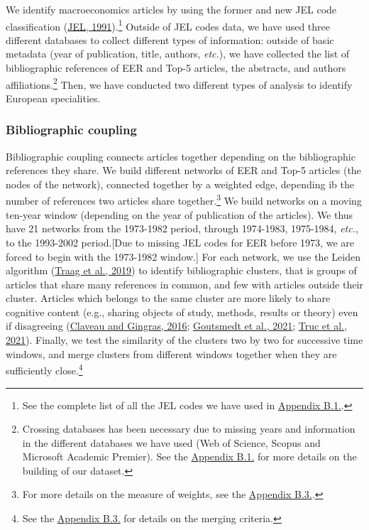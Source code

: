\documentclass[]{elsarticle} %
\begin{document}
We identify macroeconomics articles by using the former and new JEL code
classification (\protect\hyperlink{ref-jel1991}{JEL, 1991}).\footnote{See
  the complete list of all the JEL codes we have used in
  \protect\hyperlink{eer-top5-macro}{Appendix B.1.}.} Outside of JEL
codes data, we have used three different databases to collect different
types of information: outside of basic metadata (year of publication,
title, authors, \emph{etc.}), we have collected the list of
bibliographic references of EER and Top-5 articles, the abstracts, and
authors affiliations.\footnote{Crossing databases has been necessary due
  to missing years and information in the different databases we have
  used (Web of Science, Scopus and Microsoft Academic Premier). See the
  \protect\hyperlink{corpus}{Appendix B.1.} for more details on the
  building of our dataset.} Then, we have conducted two different types
of analysis to identify European specialities.

\hypertarget{bibliographic-coupling}{%
\subsubsection{Bibliographic coupling}\label{bibliographic-coupling}}

Bibliographic coupling connects articles together depending on the
bibliographic references they share. We build different networks of EER
and Top-5 articles (the nodes of the network), connected together by a
weighted edge, depending ib the number of references two articles share
together.\footnote{For more details on the measure of weights, see the
  \protect\hyperlink{network}{Appendix B.3.}.} We build networks on a
moving ten-year window (depending on the year of publication of the
articles). We thus have 21 networks from the 1973-1982 period, through
1974-1983, 1975-1984, \emph{etc.}, to the 1993-2002 period.{[}Due to
missing JEL codes for EER before 1973, we are forced to begin with the
1973-1982 window.{]} For each network, we use the Leiden algorithm
(\protect\hyperlink{ref-traag2019}{Traag et al., 2019}) to identify
bibliographic clusters, that is groups of articles that share many
references in common, and few with articles outside their cluster.
Articles which belongs to the same cluster are more likely to share
cognitive content (e.g., sharing objects of study, methods, results or
theory) even if disagreeing (\protect\hyperlink{ref-claveau2016}{Claveau
and Gingras, 2016}; \protect\hyperlink{ref-goutsmedt2021}{Goutsmedt et
al., 2021}; \protect\hyperlink{ref-truc2021}{Truc et al., 2021}).
Finally, we test the similarity of the clusters two by two for
successive time windows, and merge clusters from different windows
together when they are sufficiently close.\footnote{See the
  \protect\hyperlink{network}{Appendix B.3.} for details on the merging
  criteria.}
\end{document}
